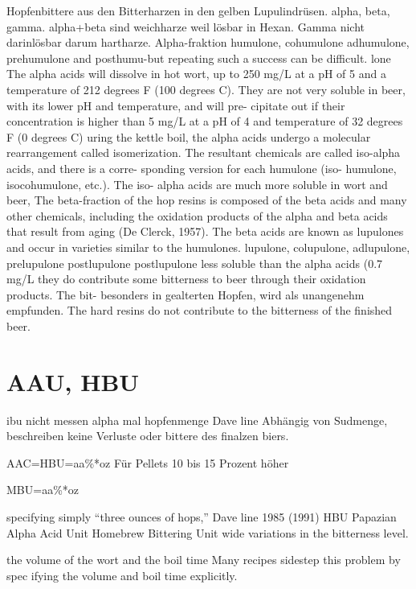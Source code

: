 \documentclass[a4paper,parskip=half]{scrartcl}
\begin{document}
\parencite[55]{Hall1997}
Hopfenbittere aus den Bitterharzen in den gelben Lupulindrüsen.
alpha, beta, gamma. alpha+beta sind weichharze weil
lösbar in Hexan. Gamma nicht darinlösbar darum
hartharze. Alpha-fraktion humulone, cohumulone
adhumulone, prehumulone and posthumu-but repeating such a success can be difficult.
lone
The alpha acids will dissolve
in hot wort, up to 250 mg/L at a pH of 5 and
a temperature of 212 degrees F (100 degrees
C). They are not very soluble in beer, with
its lower pH and temperature, and will pre-
cipitate out if their concentration is higher
than 5 mg/L at a pH of 4 and temperature of
32 degrees F (0 degrees C)
uring the kettle boil, the alpha acids
undergo a molecular rearrangement called
isomerization. The resultant chemicals are
called iso-alpha acids, and there is a corre-
sponding version for each humulone (iso-
humulone, isocohumulone, etc.). The iso-
alpha acids are much more soluble in wort
and beer,
The beta-fraction of the hop resins is
composed of the beta acids and many other
chemicals, including the oxidation products
of the alpha and beta acids that result from
aging (De Clerck, 1957). The beta acids are
known as lupulones and occur in varieties
similar to the humulones.
lupulone,
colupulone, adlupulone, prelupulone
postlupulone
postlupulone
less soluble than the alpha acids (0.7 mg/L
they do contribute some bitterness to beer
through their oxidation products. The bit-
besonders in gealterten Hopfen, wird
als unangenehm empfunden.
The hard resins do not contribute to the
bitterness of the finished beer.



\section*{AAU, HBU}

\parencite[122\psq]{Garetz1994} 
ibu nicht messen
alpha mal hopfenmenge
Dave line
Abhängig von Sudmenge, beschreiben keine Verluste oder bittere
des finalzen biers.

\parencite[40]{Favre1990}
AAC=HBU=aa\%*oz
Für Pellets 10 bis 15 Prozent höher

\parencite[60]{Papazian2003}
MBU=aa\%*oz

\parencite[55\psq]{Hall1997}
specifying simply “three ounces of hops,”
Dave line 1985
(1991) HBU Papazian
Alpha Acid Unit
Homebrew Bittering Unit
wide variations in the bitterness level.

the volume of the wort and the boil time
Many recipes sidestep this problem by spec
ifying the volume and boil time explicitly.
\end{document}
